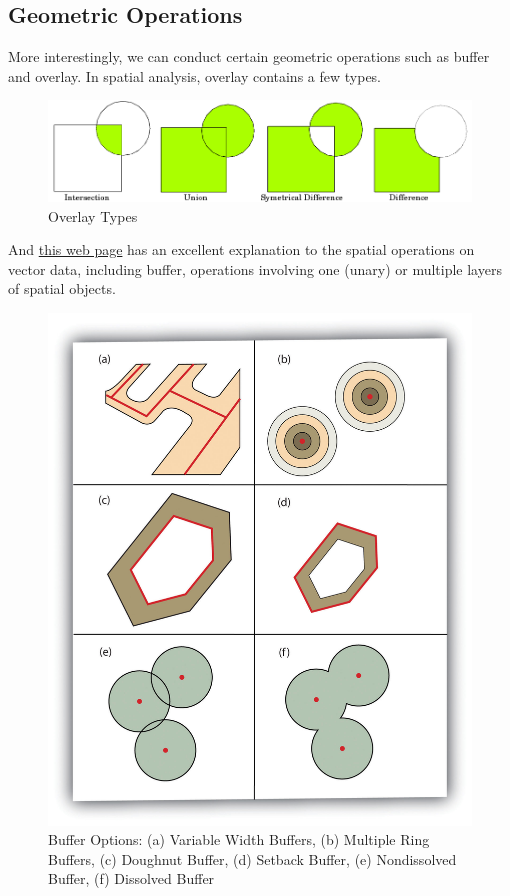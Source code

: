 \documentclass[
  11pt,
]{book}
\begin{document}
\hypertarget{geometric-operations}{%
\subsection{Geometric Operations}\label{geometric-operations}}

More interestingly, we can conduct certain geometric operations such as buffer and overlay. In spatial analysis, overlay contains a few types.

\begin{figure}
\includegraphics[width=1\linewidth]{img/overlay_operations} \caption{Overlay Types}\label{fig:overlay-types}
\end{figure}

And \href{https://saylordotorg.github.io/text_essentials-of-geographic-information-systems/s11-geospatial-analysis-i-vector-o.html}{this web page} has an excellent explanation to the spatial operations on vector data, including buffer, operations involving one (unary) or multiple layers of spatial objects.

\begin{figure}
\includegraphics[width=1\linewidth]{img/buffer_operations} \caption{Buffer Options: (a) Variable Width Buffers, (b) Multiple Ring Buffers, (c) Doughnut Buffer, (d) Setback Buffer, (e) Nondissolved Buffer, (f) Dissolved Buffer}\label{fig:buffer-types}
\end{figure}
\end{document}
